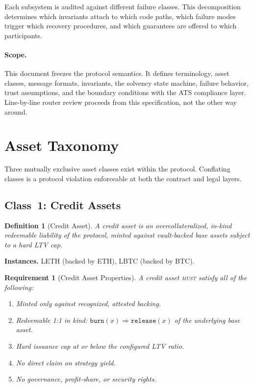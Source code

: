 \documentclass[11pt,twocolumn]{article}
\newtheorem{definition}{Definition}[section]
\newtheorem{requirement}{Requirement}[section]
\theoremstyle{remark}
\begin{document}
Each subsystem is audited against different failure classes. This decomposition determines which invariants attach to which code paths, which failure modes trigger which recovery procedures, and which guarantees are offered to which participants.

\paragraph{Scope.} This document freezes the protocol semantics. It defines terminology, asset classes, message formats, invariants, the solvency state machine, failure behavior, trust assumptions, and the boundary conditions with the ATS compliance layer. Line-by-line router review proceeds from this specification, not the other way around.


\section{Asset Taxonomy}
\label{sec:taxonomy}

Three mutually exclusive asset classes exist within the protocol. Conflating classes is a protocol violation enforceable at both the contract and legal layers.

\subsection{Class~1: Credit Assets}
\label{sec:credit}

\begin{definition}[Credit Asset]
A credit asset is an overcollateralized, in-kind redeemable liability of the protocol, minted against vault-backed base assets subject to a hard LTV cap.
\end{definition}

\noindent\textbf{Instances.} LETH (backed by ETH), LBTC (backed by BTC).

\begin{requirement}[Credit Asset Properties]
\label{req:credit}
A credit asset \textsc{must} satisfy all of the following:
\begin{enumerate}[nosep]
  \item Minted only against recognized, attested backing.
  \item Redeemable 1:1 in kind: $\texttt{burn}(x) \Rightarrow \texttt{release}(x)$ of the underlying base asset.
  \item Hard issuance cap at or below the configured LTV ratio.
  \item No direct claim on strategy yield.
  \item No governance, profit-share, or security rights.
\end{enumerate}
\end{requirement}
\end{document}
